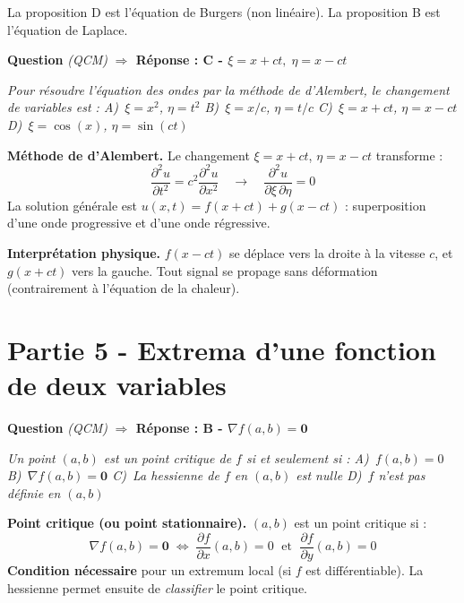 \documentclass[11pt,a4paper]{article}
\newcounter{qnum}
\newcommand{\qtitre}[2]{%
  \stepcounter{qnum}%
  \medskip\noindent
  \textbf{\color{bleutexte}Question \theqnum}\enspace
  \textit{(#1)}\enspace
  \textcolor{vertok}{\textbf{$\Rightarrow$ Réponse : #2}}
  \par\smallskip
}
\newcommand{\qenonce}[1]{%
  \begin{mdframed}[backgroundcolor=grisbox, linewidth=0pt,
    innerleftmargin=8pt, innerrightmargin=8pt,
    innertopmargin=5pt, innerbottommargin=5pt,
    skipabove=2pt, skipbelow=4pt]
  \small\textit{#1}
  \end{mdframed}
}
\begin{document}
La proposition D est l'équation de Burgers (non linéaire). La proposition B est l'équation de Laplace.

\qtitre{QCM}{C - $\xi = x+ct,\;\eta = x-ct$}
\qenonce{Pour résoudre l'équation des ondes par la méthode de d'Alembert, le changement de variables est :
\quad A)~$\xi=x^2$, $\eta=t^2$
\quad B)~$\xi=x/c$, $\eta=t/c$
\quad C)~$\xi=x+ct$, $\eta=x-ct$
\quad D)~$\xi=\cos(x)$, $\eta=\sin(ct)$}

\begin{methodebox}
\textbf{Méthode de d'Alembert.} Le changement $\xi = x+ct$, $\eta = x-ct$ transforme :
$$\frac{\partial^2 u}{\partial t^2} = c^2\frac{\partial^2 u}{\partial x^2} \quad\longrightarrow\quad \frac{\partial^2 u}{\partial\xi\,\partial\eta} = 0$$
La solution générale est $u(x,t) = f(x+ct) + g(x-ct)$ : superposition d'une onde progressive et d'une onde régressive.
\end{methodebox}

\begin{piegebox}
\textbf{Interprétation physique.} $f(x-ct)$ se déplace vers la droite à la vitesse $c$, et $g(x+ct)$ vers la gauche. Tout signal se propage sans déformation (contrairement à l'équation de la chaleur).
\end{piegebox}

\section{Partie 5 - Extrema d'une fonction de deux variables}

\qtitre{QCM}{B - $\nabla f(a,b) = \mathbf{0}$}
\qenonce{Un point $(a,b)$ est un point critique de $f$ si et seulement si :
\quad A)~$f(a,b) = 0$
\quad B)~$\nabla f(a,b) = \mathbf{0}$
\quad C)~La hessienne de $f$ en $(a,b)$ est nulle
\quad D)~$f$ n'est pas définie en $(a,b)$}

\begin{methodebox}
\textbf{Point critique (ou point stationnaire).} $(a,b)$ est un point critique si :
$$\nabla f(a,b) = \mathbf{0} \;\Longleftrightarrow\; \frac{\partial f}{\partial x}(a,b) = 0 \;\text{ et }\; \frac{\partial f}{\partial y}(a,b) = 0$$
\textbf{Condition nécessaire} pour un extremum local (si $f$ est différentiable). La hessienne permet ensuite de \emph{classifier} le point critique.
\end{methodebox}
\end{document}

